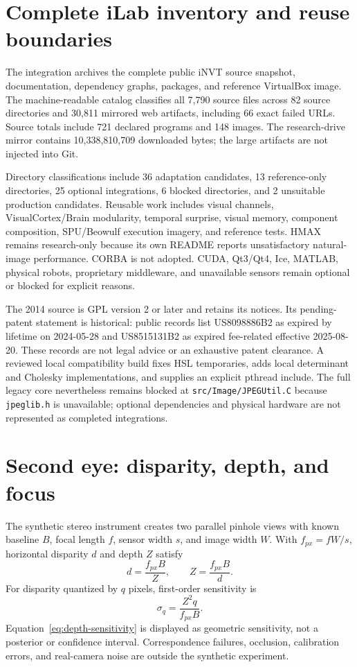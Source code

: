 \section{Complete iLab inventory and reuse boundaries}
The integration archives the complete public iNVT source snapshot, documentation, dependency graphs, packages, and reference VirtualBox image. The machine-readable catalog classifies all 7,790 source files across 82 source directories and 30,811 mirrored web artifacts, including 66 exact failed URLs. Source totals include 721 declared programs and 148 images. The research-drive mirror contains 10,338,810,709 downloaded bytes; the large artifacts are not injected into Git.

Directory classifications include 36 adaptation candidates, 13 reference-only directories, 25 optional integrations, 6 blocked directories, and 2 unsuitable production candidates. Reusable work includes visual channels, VisualCortex/Brain modularity, temporal surprise, visual memory, component composition, SPU/Beowulf execution imagery, and reference tests. HMAX remains research-only because its own README reports unsatisfactory natural-image performance. CORBA is not adopted. CUDA, Qt3/Qt4, Ice, MATLAB, physical robots, proprietary middleware, and unavailable sensors remain optional or blocked for explicit reasons.

The 2014 source is GPL version 2 or later and retains its notices. Its pending-patent statement is historical: public records list US8098886B2 as expired by lifetime on 2024-05-28 and US8515131B2 as expired fee-related effective 2025-08-20. These records are not legal advice or an exhaustive patent clearance. A reviewed local compatibility build fixes HSL temporaries, adds local determinant and Cholesky implementations, and supplies an explicit pthread include. The full legacy core nevertheless remains blocked at \texttt{src/Image/JPEGUtil.C} because \texttt{jpeglib.h} is unavailable; optional dependencies and physical hardware are not represented as completed integrations.

\section{Second eye: disparity, depth, and focus}
The synthetic stereo instrument creates two parallel pinhole views with known baseline $B$, focal length $f$, sensor width $s$, and image width $W$. With $f_{px}=fW/s$, horizontal disparity $d$ and depth $Z$ satisfy
\begin{equation}
d=\frac{f_{px}B}{Z},\qquad Z=\frac{f_{px}B}{d}.
\end{equation}
For disparity quantized by $q$ pixels, first-order sensitivity is
\begin{equation}
\sigma_q=\frac{Z^2q}{f_{px}B}.
\label{eq:depth-sensitivity}
\end{equation}
Equation~\eqref{eq:depth-sensitivity} is displayed as geometric sensitivity, not a posterior or confidence interval. Correspondence failures, occlusion, calibration errors, and real-camera noise are outside the synthetic experiment.

